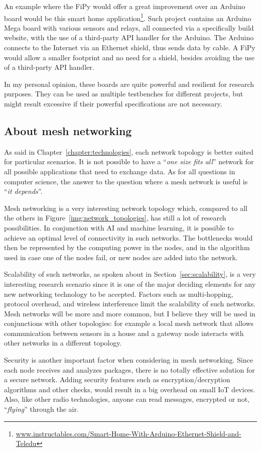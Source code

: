 			An example where the FiPy would offer a great improvement over an Arduino board would be this smart home application\footnote{ \url{www.instructables.com/Smart-Home-With-Arduino-Ethernet-Shield-and-Teledu}}.
			Such project contains an Arduino Mega board with various sensors and relays, all connected via a specifically build website, with the use of a third-party API handler for the Arduino.
			The Arduino connects to the Internet via an Ethernet shield, thus sends data by cable.
			A FiPy would allow a smaller footprint and no need for a shield, besides avoiding the use of a third-party API handler.
					
			In my personal opinion, these boards are quite powerful and resilient for research purposes.
			They can be used as multiple testbenches for different projects, but might result excessive if their powerful specifications are not necessary.
			
		\subsection{About mesh networking}\label{sec:mesh_considerations}
			
			As said in Chapter~\ref{chapter:technologies}, each network topology is better suited for particular scenarios.
			It is not possible to have a ``\textit{one size fits all}'' network for all possible applications that need to exchange data.
			As for all questions in computer science, the answer to the question where a mesh network is useful is ``\textit{it depends}''.
			
			Mesh networking is a very interesting network topology which, compared to all the others in Figure~\ref{img:network_topologies}, has still a lot of research possibilities.
			In conjunction with AI and machine learning, it is possible to achieve an optimal level of connectivity in such networks.
			The bottlenecks would then be represented by the computing power in the nodes, and in the algorithm used in case one of the nodes fail, or new nodes are added into the network.

			Scalability of such networks, as spoken about in Section~\ref{sec:scalability}, is a very interesting research scenario since it is one of the major deciding elements for any new networking technology to be accepted.
			Factors such as multi-hopping, protocol overhead, and wireless interference limit the scalability of such networks.
			Mesh networks will be more and more common, but I believe they will be used in conjunctions with other topologies: for example a local mesh network that allows communication between sensors in a house and a gateway node interacts with other networks in a different topology.
			
			Security is another important factor when considering in mesh networking.
			Since each node receives and analyzes packages, there is no totally effective solution for a secure network.
			Adding security features such as encryption/decryption algorithms and other checks, would result in a big overhead on small IoT devices.
			Also, like other radio technologies, anyone can read messages, encrypted or not, ``\textit{flying}'' through the air.